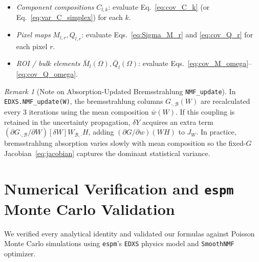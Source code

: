 \documentclass[11pt,a4paper]{article}
\theoremstyle{plain}
\theoremstyle{definition}
\theoremstyle{remark}
\newtheorem{remark}[theorem]{Remark}
\newcommand{\B}{\mathcal{B}}
\begin{document}
\begin{tcolorbox}[colback=gray!4!white,colframe=gray!60!black,title={Algorithm: Exact $\mathcal{O}(p)$ Uncertainty Evaluation for \texttt{espm}},breakable]
\begin{enumerate}[leftmargin=1.5em]
    \begin{itemize}[leftmargin=1.2em]
        \item \emph{Component compositions} $C_{l,k}$: evaluate Eq.~\eqref{eq:cov_C_k} (or Eq.~\eqref{eq:var_C_simplex}) for each $k$.
        \item \emph{Pixel maps} $M_{l,r}, Q_{l,r}$: evaluate Eqs.~\eqref{eq:Sigma_M_r} and \eqref{eq:cov_Q_r} for each pixel $r$.
        \item \emph{ROI / bulk elements} $\bar{M}_l(\Omega), \bar{Q}_l(\Omega)$: evaluate Eqs.~\eqref{eq:cov_M_omega}--\eqref{eq:cov_Q_omega}.
    \end{itemize}
\end{enumerate}
\end{tcolorbox}

\begin{remark}[Note on Absorption-Updated Bremsstrahlung \texttt{NMF\_update}]
In \texttt{EDXS.NMF\_update(W)}, the bremsstrahlung columns $G_{\cdot, \B}(W)$ are recalculated every 3 iterations using the mean composition $\bar{w}(W)$. If this coupling is retained in the uncertainty propagation, $\delta Y$ acquires an extra term $(\partial G_{\cdot,\B}/\partial W)[\delta W] W_{\B,\cdot} H$, adding $(\partial G/\partial w)(W H)$ to $J_W$. In practice, bremsstrahlung absorption varies slowly with mean composition so the fixed-$G$ Jacobian~\eqref{eq:jacobian} captures the dominant statistical variance.
\end{remark}

\section{Numerical Verification and \texttt{espm} Monte Carlo Validation}

We verified every analytical identity and validated our formulas against Poisson Monte Carlo simulations using \texttt{espm}'s \texttt{EDXS} physics model and \texttt{SmoothNMF} optimizer.
\end{document}
